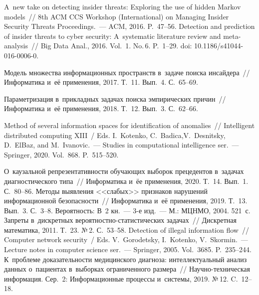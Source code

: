 \begin{multicols}{2}
{{\begin{thebibliography}{99}
 A~new take on detecting insider threats: Exploring the 
use of hidden Markov models~//  8th ACM CCS  Workshop (International) on Managing Insider Security 
Threats Proceedings.~--- ACM, 2016. P.~47--56.
 Detection and prediction of insider threats to cyber security: 
A~systematic literature review and meta-analysis~// Big Data Anal., 2016. Vol.~1. No.\,6. P.~1--29. doi: 
10.1186/s41044-016-0006-0.

 Модель множества 
информационных пространств в~задаче поиска инсайдера~// Информатика и~её применения, 
2017. Т.~11. Вып.~4. С.~65--69.


Параметризация в~прикладных задачах поиска эмпирических причин~// Информатика и~её 
применения, 2018. Т.~12. Вып.~3. С.~62--66.

 Method of several information spaces for identification of 
anomalies~// 
Intelligent distributed computing XIII~/ Eds. I.~Kotenko, C.~Badica,V.~Desnitsky, D.~ElBaz, and 
M.~Ivanovic.~--- 
Studies in computational intelligence ser.~--- Springer, 2020. Vol.~868. P.~515--520.

 О~каузальной репрезентативности 
обучающих выборок прецедентов в~задачах диагностического типа~// Информатика и~ёе 
применения, 2020. Т.~14. Вып.~1. С.~80--86.
 Методы выявления <<слабых>> признаков 
нарушений информационной  
безопас\-ности~// Информатика и~её применения, 2019. Т.~13. Вып.~3. С.~3--8.
 Вероятность: В~2 кн.~--- 3-е изд.~--- М.: МЦНМО, 2004. 
521~с.
 Запреты в~дискретных ве\-ро\-ят\-ност\-но-ста\-ти\-сти\-че\-ских 
задачах~// Дискретная математика, 2011. Т.~23. №\,2. С.~53--58.
 Detection of illegal information flow~// Computer network 
security~/ Eds. V.~Gorodetsky, I.~Kotenko, V.~Skormin.~--- Lecture notes in computer 
science ser.~--- Springer, 2005. Vol.~3685.  P.~235--244.
 К~проб\-ле\-ме доказательности медицинского 
диагноза: интеллектуальный анализ данных о~пациентах в~выборках ограниченного 
размера~// На\-уч\-но-тех\-ни\-че\-ская информация. Сер.~2: Информационные процессы 
и~системы, 2019. №\,12. C.~12--18. 
\end{thebibliography}

 }
 }

\end{multicols}

